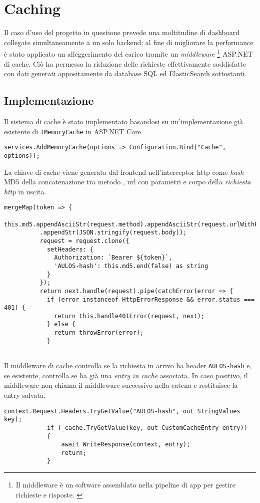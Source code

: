 \section{Caching}
\label{ch:caching}
Il caso d'uso del progetto in questione prevede una moltitudine di dashboard collegate simultaneamente a un solo backend; al fine di  migliorare la performance è stato applicato un alleggerimento del carico tramite un \textit{middleware} \footnote{Il middleware è un software assemblato nella pipeline di app per gestire richieste e risposte. \cite{Middleware}} ASP.NET di cache. Ciò ha permesso la riduzione delle richieste effettivamente soddisfatte con dati generati appositamente da database SQL ed ElasticSearch sottostanti.
\subsection{Implementazione}
Il sistema di cache è stato implementato basandosi su un'implementazione già esistente di \verb|IMemoryCache| in ASP.NET Core. \cite{MemCache}
\begin{lstlisting}[caption={Startup.cs, Memory Cache Injection}, style=javaScriptCode]
services.AddMemoryCache(options => Configuration.Bind("Cache", options));
\end{lstlisting}

La chiave di cache viene generata dal frontend nell'interceptor http come \textit{hash} MD5 \cite{MD5} della concatenazione tra metodo \cite{HTTPMETHODS}, url con parametri \cite{HTTPPARAMS} e corpo \cite{HTTPBODY} della \textit{richiesta http} in uscita.
\begin{lstlisting}[caption={Http Interceptor, line 28}, style=javaScriptCode]
mergeMap(token => {
          this.md5.appendAsciiStr(request.method).appendAsciiStr(request.urlWithParams)
          .appendStr(JSON.stringify(request.body));
          request = request.clone({
            setHeaders: {
              Authorization: `Bearer ${token}`,
              'AULOS-hash': this.md5.end(false) as string
            }
          });
          return next.handle(request).pipe(catchError(error => {
            if (error instanceof HttpErrorResponse && error.status === 401) {
              return this.handle401Error(request, next);
            } else {
              return throwError(error);
            }
          
\end{lstlisting}

Il middleware di cache controlla se la richiesta in arrivo ha header \verb|AULOS-hash| e, se esistente, controlla se ha già una \textit{entry in cache} associata. In caso positivo, il middleware non chiama il middleware successivo nella catena e restituisce la entry salvata.
\begin{lstlisting}[caption={TotallyOriginalCachingMiddleware.cs, Cache hit scenario}, style=javaScriptCode]
context.Request.Headers.TryGetValue("AULOS-hash", out StringValues key);
            if (_cache.TryGetValue(key, out CustomCacheEntry entry))
            {
                await WriteResponse(context, entry);
                return;
            }
\end{lstlisting}

